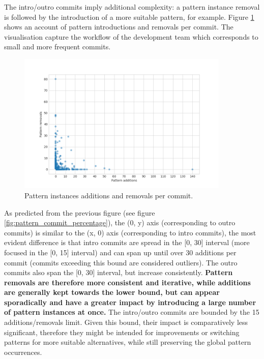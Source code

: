 The intro/outro commits imply additional complexity: a pattern instance removal is followed by the introduction of a more suitable pattern, for example. Figure \ref{fig:add_rem_commit} shows an account of pattern introductions and removals per commit. The visualisation capture the workflow of the development team which corresponds to small and more frequent commits.

\begin{figure}[H]
    \centering
    \includegraphics[width = 0.9\textwidth]{images/graphs/additions_removals_commit.png}
    \caption{Pattern instances additions and removals per commit.}
    \label{fig:add_rem_commit}
\end{figure}

 As predicted from the previous figure (see figure \ref{fig:pattern_commit_percentage}), the (0, y) axis (corresponding to outro commits) is similar to the (x, 0) axis (corresponding to intro commits), the most evident difference is that intro commits are spread in the [0, 30] interval (more focused in the [0, 15] interval) and can span up until over 30 additions per commit (commits exceeding this bound are considered outliers). The outro commits also span the [0, 30] interval, but increase consistently. \textbf{Pattern removals are therefore more consistent and iterative, while additions are generally kept towards the lower bound, but can appear sporadically and have a greater impact by introducing a large number of pattern instances at once.} The intro/outro commits are bounded by the 15 additions/removals limit. Given this bound, their impact is comparatively less significant, therefore they might be intended for improvements or switching patterns for more suitable alternatives, while still preserving the global pattern occurrences. 



